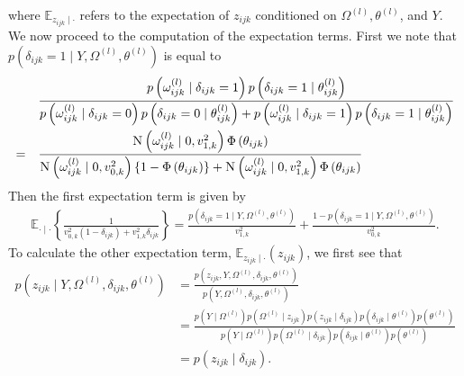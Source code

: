 \documentclass[a4paper, 11pt, oneside]{report}
\newcommand{\E}{\mathbb{E}}
\newcommand{\1}{\mathds{1}}
\newcommand{\powl}{^{(l)}}
\newcommand{\Nor}{\textsc{N}}
\begin{document}
where $\E_{z_{ijk} \mid \cdot}$ refers to the expectation of $z_{ijk}$ conditioned on
$\Omega\powl, \theta\powl$, and $Y$.
We now proceed to the computation of the expectation terms.
First we note that $p(\delta_{ijk} = 1 \mid Y, \Omega\powl, \theta\powl)$
is equal to
\begin{align*}
	       & \frac{p\left(\omega_{ijk}\powl \mid \delta_{ijk}=1\right) p\left(\delta_{ijk}=1 \mid
		\theta_{ijk}\powl\right)}{p\left(\omega_{ijk}\powl \mid \delta_{ijk}=0\right) p\left(\delta_{ijk}=0 \mid
		\theta_{ijk}\powl\right) + p\left(\omega_{ijk}\powl \mid \delta_{ijk}=1\right) p\left(\delta_{ijk}=1 \mid
	\theta_{ijk}\powl\right)}                                                                     \\
	=\quad & \frac{\Nor\left(\omega_{ijk}\powl \mid 0,
		v_{1,k}^2\right)\Phi\left(\theta_{ijk}\right)}{\Nor\left(\omega_{ijk}\powl \mid 0,
		v_{0,k}^2\right)\{1 -
		\Phi\left(\theta_{ijk}\right)\} +
		\Nor\left(\omega_{ijk}\powl \mid 0, v_{1,k}^2\right)
		\Phi\left(\theta_{ijk}\right)}
\end{align*}
Then the first expectation term is given by
\begin{align*}
	\E_{\cdot \mid \cdot} \left\{ \frac{1}{v_{0,k}^2 (1 - \delta_{ijk}) + v_{1,k}^2 \delta_{ijk}} \right\}
	= \frac{p\left(\delta_{ijk} = 1 \mid Y, \Omega\powl, \theta\powl\right)}{v_{1,k}^2}
	+ \frac{1 - p\left(\delta_{ijk} = 1 \mid Y, \Omega\powl,
		\theta\powl\right)}{v_{0,k}^2}.
\end{align*}
To calculate the other expectation term, $\E_{z_{ijk} \mid \cdot}(z_{ijk})$, we
first see that
\begin{align*}
	p \left(z_{ijk} \mid Y, \Omega\powl, \delta_{ijk}, \theta\powl\right) & = \frac{p\left(z_{ijk}, Y, \Omega\powl, \delta_{ijk}, \theta\powl\right)}{p\left(Y, \Omega\powl, \delta_{ijk}, \theta\powl\right)}                                                                                                                                                                                                                 \\
	                                                                      & = \frac{p\left(Y \mid \Omega\powl\right) p\left(\Omega\powl \mid z_{ijk}\right) p\left(z_{ijk} \mid \delta_{ijk}\right) p\left(\delta_{ijk} \mid \theta\powl\right) p\left(\theta\powl\right)}{p\left(Y \mid \Omega\powl\right) p\left(\Omega\powl \mid \delta_{ijk}\right) p\left(\delta_{ijk} \mid \theta\powl\right) p\left(\theta\powl\right)} \\
	                                                                      & = p(z_{ijk} \mid \delta_{ijk}).
\end{align*}
\end{document}
